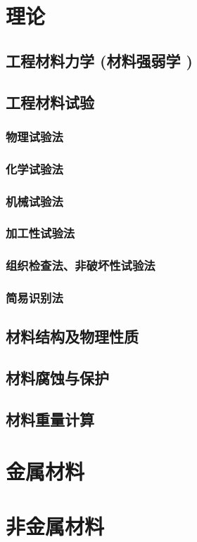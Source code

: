 \documentclass[UTF8]{../../ApplicationUniverse}
\begin{document}
\section{理论}
    \subsection{工程材料力学 (材料强弱学 )}
    \subsection{工程材料试验}
        \subsubsection{物理试验法}
        \subsubsection{化学试验法}
        \subsubsection{机械试验法}
        \subsubsection{加工性试验法}
        \subsubsection{组织检查法、非破坏性试验法}
        \subsubsection{简易识别法}
    \subsection{材料结构及物理性质}
    \subsection{材料腐蚀与保护}
    \subsection{材料重量计算}

\section{金属材料}
\section{非金属材料}
\end{document}
